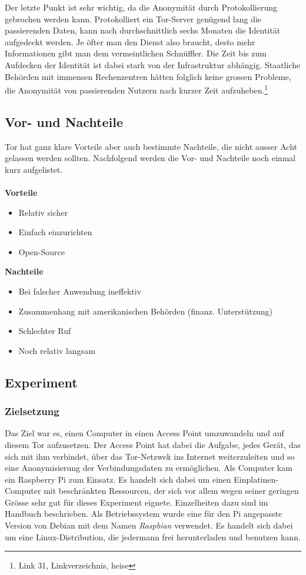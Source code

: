 Der letzte Punkt ist sehr wichtig, da die Anonymität durch Protokollierung gebrochen werden kann. Protokolliert ein Tor-Server genügend lang die passierenden Daten, kann nach durchschnittlich sechs Monaten die Identität aufgedeckt werden. Je öfter man den Dienst also braucht, desto mehr Informationen gibt man dem vermeintlichen Schnüffler. Die Zeit bis zum Aufdecken der Identität ist dabei stark von der Infrastruktur abhängig. Staatliche Behörden mit immensen Rechenzentren hätten folglich keine grossen Probleme, die Anonymität von passierenden Nutzern nach kurzer Zeit aufzuheben.\footnote{Link 31, Linkverzeichnis, heise}

\subsection{Vor- und Nachteile}
Tor hat ganz klare Vorteile aber auch bestimmte Nachteile, die nicht ausser Acht gelassen werden sollten.
Nachfolgend werden die Vor- und Nachteile noch einmal kurz aufgelistet.
\\
\\

\textbf{Vorteile}
\begin{itemize}
\item Relativ sicher
\item Einfach einzurichten
\item Open-Source
\end{itemize}

\textbf{Nachteile}
\begin{itemize}
\item Bei falscher Anwendung ineffektiv
\item Zusammenhang mit amerikanischen Behörden (finanz. Unterstützung)
\item Schlechter Ruf
\item Noch relativ langsam
\end{itemize}

\subsection{Experiment}

\subsubsection{Zielsetzung}
Das Ziel war es, einen Computer in einen Access Point umzuwandeln und auf diesem Tor aufzusetzen.
Der Access Point hat dabei die Aufgabe, jedes Gerät, das sich mit ihm verbindet, über das Tor-Netzwek ins Internet weiterzuleiten und so eine Anonymisierung der Verbindungsdaten zu ermöglichen.
Als Computer kam ein Raspberry Pi zum Einsatz.
Es handelt sich dabei um einen Einplatinen-Computer mit beschränkten Ressourcen, der sich vor allem wegen seiner geringen Grösse sehr gut für dieses Experiment eignete.
Einzelheiten dazu sind im Handbuch beschrieben.
Als Betriebssystem wurde eine für den Pi angepasste Version von Debian mit dem Namen \textit{Raspbian} verwendet.
Es handelt sich dabei um eine Linux-Distribution, die jedermann frei herunterladen und benutzen kann.


